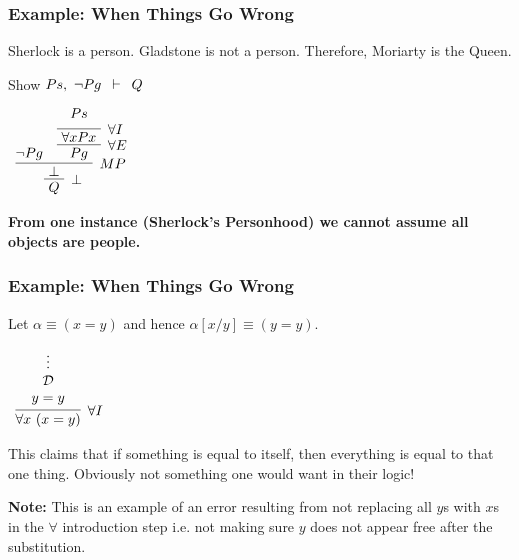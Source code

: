 \documentclass{beamer}
\theoremstyle{indentDefn} \newtheorem{defn}[]{Definition}
\begin{document}
\begin{frame}
	\frametitle{Example: When Things Go Wrong}
	
	Sherlock is a person. Gladstone is not a person. Therefore, Moriarty is the Queen.
	
	\vspace{0.5cm}
	
	Show $Ps, \ \lnot Pg \hspace{0.5em} \vdash \hspace{0.5em} Q$
	
	
	\begin{center}
		$\begin{array}{c}
			\infer[\bot]{Q}
				{\infer[MP]{ \ \bot \ }{\lnot Pg & \infer[\forall E]{ \ Pg \ }{\infer[\forall I]{ \ \forall x Px \ }{Ps\vspace{0.2cm}}}}}
		\end{array}$
	\end{center}
	
	\pause
	{\bf From one instance (Sherlock's Personhood) we cannot assume all objects are people.}
	
\end{frame}

\begin{frame}
	\frametitle{Example: When Things Go Wrong}
	
	Let $\alpha \equiv (x = y)$ and hence $\alpha[x/y] \equiv (y = y)$.

	\begin{center}
		$\begin{array}{c}
			\infer[\forall I]{\forall x \ (x = y)}
				{\begin{array}{c} \vdots \\ \mathcal{D} \\ y = y \end{array}}
		\end{array}$
	\end{center}

	This claims that if something is equal to itself, then everything is equal to that one thing. Obviously not something one would want in their logic!

	{\bf Note:} This is an example of an error resulting from not replacing all $y$s with $x$s in the $\forall$ introduction step i.e. not making sure $y$ does not appear free after the substitution. 

	\vspace{1cm}
	
\end{frame}
\end{document}
